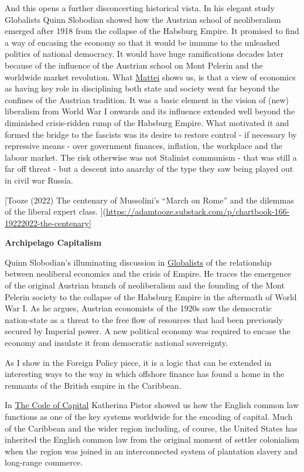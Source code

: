 \documentclass[
]{book}
\begin{document}
And this opens a further disconcerting historical vista. In his elegant study Globalists Quinn Slobodian showed how the Austrian school of neoliberalism emerged after 1918 from the collapse of the Habsburg Empire. It promised to find a way of encasing the economy so that it would be immune to the unleashed politics of national democracy. It would have huge ramifications decades later because of the influence of the Austrian school on Mont Pelerin and the worldwide market revolution. What \href{https://jacobin.com/2022/10/mussolini-fascism-liberalism-austerity}{Mattei} shows us, is that a view of economics as having key role in disciplining both state and society went far beyond the confines of the Austrian tradition. It was a basic element in the vision of (new) liberalism from World War I onwards and its influence extended well beyond the diminished crisis-ridden rump of the Habsburg Empire. What motivated it and formed the bridge to the fascists was its desire to restore control - if necessary by repressive means - over government finances, inflation, the workplace and the labour market. The risk otherwise was not Stalinist communism - that was still a far off threat - but a descent into anarchy of the type they saw being played out in civil war Russia.

{[}Tooze (2022) The centenary of Mussolini's ``March on Rome'' and the dilemmas of the liberal expert class. {]}(\url{https://adamtooze.substack.com/p/chartbook-166-19222022-the-centenary}{]}

\textbf{Archipelago Capitalism}

Quinn Slobodian's illuminating discussion in \href{https://www.hup.harvard.edu/catalog.php?isbn=9780674979529}{Globalists} of the relationship between neoliberal economics and the crisis of Empire. He traces the emergence of the original Austrian branch of neoliberalism and the founding of the Mont Pelerin society to the collapse of the Habsburg Empire in the aftermath of World War I. As he argues, Austrian economists of the 1920s saw the democratic nation-state as a threat to the free flow of resources that had been previously secured by Imperial power. A new political economy was required to encase the economy and insulate it from democratic national sovereignty.

As I show in the Foreign Policy piece, it is a logic that can be extended in interesting ways to the way in which offshore finance has found a home in the remnants of the British empire in the Caribbean.

In \href{https://press.princeton.edu/books/paperback/9780691208602/the-code-of-capital}{The Code of Capital} Katherina Pistor showed us how the English common law functions as one of the key systems worldwide for the encoding of capital. Much of the Caribbean and the wider region including, of course, the United States has inherited the English common law from the original moment of settler colonialism when the region was joined in an interconnected system of plantation slavery and long-range commerce.
\end{document}
